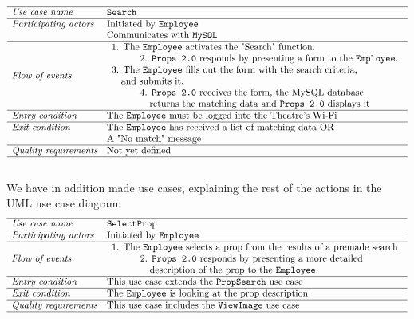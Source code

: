 \documentclass[12pt]{article}
\begin{document}
\[
\begin{array}{ll}
\hline
\textit{Use case name} & \texttt{Search} \\
\hline
\textit{Participating actors} & \text{Initiated by \texttt{Employee}} \\
& \text{Communicates with \texttt{MySQL}} \\
\hline
\textit{Flow of events} & 
\begin{array}{l}
\text{1. The \texttt{Employee} activates the "Search" function.}\\
\quad \quad \quad \text{2. \texttt{Props 2.0} responds by presenting a form to the \texttt{Employee}.} \\
\text{3. The \texttt{Employee} fills out the form with the search criteria,} \\ \quad \text{and submits it.} \\
\quad \quad \quad \text{4. \texttt{Props 2.0} receives the form, the MySQL database} \\ \quad \quad \quad \quad \text{returns the matching data and \texttt{Props 2.0} displays it}
\end{array} \\
\hline
\textit{Entry condition} & \text{The \texttt{Employee} must be logged into the Theatre's Wi-Fi} \\
\hline
\textit{Exit condition} & \text{The \texttt{Employee} has received a list of matching data OR} \\ & \text{A "No match"  message} \\
\hline
\textit{Quality requirements} & \text{Not yet defined} \\
\hline
\end{array}
\]
\\
We have in addition made use cases, explaining the rest of the actions in the UML use case diagram: \\
\[
\begin{array}{ll}
\hline
\textit{Use case name} & \texttt{SelectProp} \\
\hline
\textit{Participating actors} & \text{Initiated by \texttt{Employee}} \\
\hline
\textit{Flow of events} & 
\begin{array}{l}
\text{1. The \texttt{Employee} selects a prop from the results of a premade search} \\
\quad \quad \quad \text{2. \texttt{Props 2.0} responds by presenting a more detailed}\\ \quad \quad \quad \quad \text{description of the prop to the \texttt{Employee}.}
\end{array} \\
\hline
\textit{Entry condition} & \text{This use case extends the  \texttt{PropSearch} use case} \\
\hline
\textit{Exit condition} & \text{The \texttt{Employee} is looking at the prop description} \\
\hline
\textit{Quality requirements} & \text{This use case includes the \texttt{ViewImage} use case} \\
\hline
\end{array}
\]
\end{document}
